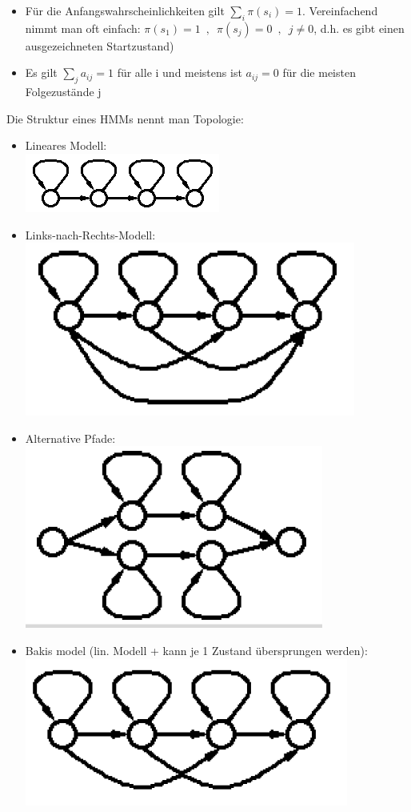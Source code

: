 \documentclass[a4paper,10pt,oneside]{article}
\begin{document}
\begin{itemize}
	\item Für die Anfangswahrscheinlichkeiten gilt $\sum_i \pi(s_i) = 1$. Vereinfachend nimmt man oft einfach: $\pi(s_1) = 1 \enspace , \enspace \pi(s_j) = 0 \enspace , \enspace j \neq 0$, d.h. es gibt einen ausgezeichneten Startzustand)
	\item Es gilt $\sum_j a_{ij} = 1$ für alle i und meistens ist $a_{ij} = 0$ für die meisten Folgezustände j
\end{itemize}
Die Struktur eines HMMs nennt man Topologie:
	\begin{itemize}
		\item Lineares Modell:  \\ \includegraphics[scale=0.3]{Grafiken/hmm-struktur.png} 
		\item Links-nach-Rechts-Modell: \\ \includegraphics[scale=0.2]{Grafiken/hmm-lnr.png} 
		\item Alternative Pfade: \\ \includegraphics[scale=0.2]{Grafiken/hmm-ap.png}
		\item Bakis model (lin. Modell + kann je 1 Zustand übersprungen werden): \\ \includegraphics[scale=0.2]{Grafiken/hmm-bakis.png}   

\end{itemize}
\end{document}
